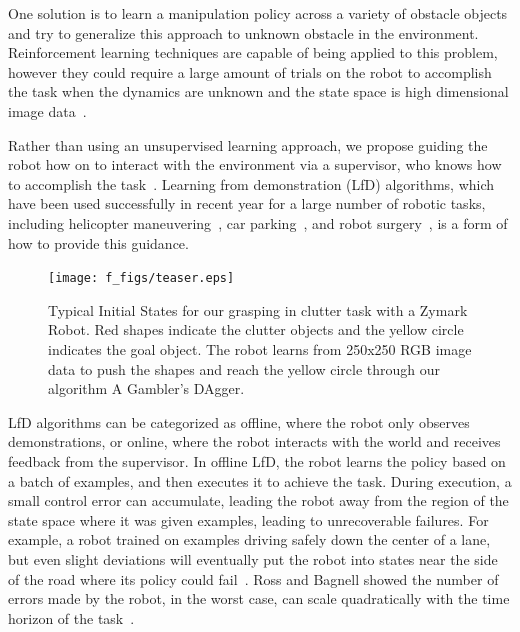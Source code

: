\documentclass[10pt, conference]{ieeeconf}      %
\begin{document}
One solution is to learn a manipulation policy across a variety of obstacle objects and try to generalize this approach to unknown obstacle in the environment. Reinforcement learning techniques are capable of being applied to this problem, however they could require a large amount of trials on the robot to accomplish the task when the dynamics are unknown and the state space is high dimensional image data~\cite{pinto2015supersizing}.


Rather than using an unsupervised learning approach, we propose guiding the robot how on to interact with the environment via a supervisor, who knows how to accomplish the task~\cite{argall2009survey}. Learning from demonstration (LfD) algorithms, which have been used successfully in recent year for a large number of robotic tasks, including helicopter maneuvering~\cite{abbeel2007application}, car parking~\cite{abbeel2008apprenticeship},  and robot surgery~\cite{van2010superhuman}, is a form of how to provide this guidance. 

 \begin{figure}
\texttt{[image: f\_figs/teaser.eps]}
\caption{Typical Initial States for our grasping in clutter task with a Zymark Robot. Red shapes indicate the clutter objects and the yellow circle indicates the goal object. The robot learns from 250x250 RGB image data to push the shapes and reach the yellow circle through our algorithm A Gambler's DAgger.}
\vspace*{-20pt}
\label{fig:teaser}
\end{figure}


LfD algorithms can be categorized as offline, where the robot only observes demonstrations, or online, where the robot interacts with the world and receives feedback from the supervisor.
In offline LfD, the robot learns the policy based on a batch of examples, and then executes it to achieve the task.  During execution, a small control error can accumulate, leading the robot away from the region of the state space where it was given examples, leading to unrecoverable failures.  For example, a robot  trained on examples driving safely down the center of a lane, but even slight deviations will eventually put the robot into states near the side of the road where its policy could  fail~\cite{pomerleau1989alvinn}. Ross and Bagnell showed the number of errors made by the robot, in the worst case,  can scale quadratically with the time horizon of the task~\cite{ross2010efficient}.
\end{document}

